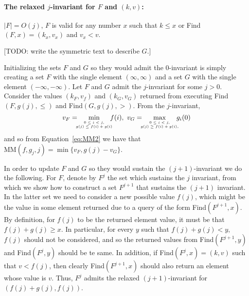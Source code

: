 \paragraph{The relaxed $j$-invariant for $F$ and $(k, v)$:}
$|F| = O(j)$, $F$ is valid for any number $x$ such that $k \leq x$ or Find$(F, x) = (k_x, v_x)$ and $v_x < v$.
\bigskip

[TODO: write the symmetric text to describe $G$.]

Initializing the sets $F$ and $G$ so they would admit the $0$-invariant is simply creating a set $F$ with the single element $(\infty, \infty)$ and a set $G$ with the single element $(-\infty, -\infty)$.
Let $F$ and $G$ admit the $j$-invariant for some $j > 0$. 
Consider the values $(k_F, v_f)$ and $(k_G, v_G)$ returned from executing Find$(F, g(j), \leq)$ and Find$(G, g(j), >)$. From the $j$-invariant,
$$
v_F = \hspace{-1em}\min\limits_{{\tiny \begin{array}{c}
		0 \leq i < j, \\
		g(j) \leq f(i) + g(i)
		\end{array}}} \hspace{-1em} f(i), \ 
v_G = \hspace{-1em}\max\limits_{{\tiny \begin{array}{c}
		0 \leq i < j, \\
		g(j) \geq f(i) + g(i),
		\end{array}}} \hspace{-1em} g_{i}(0)
$$ 
and so from Equation~\ref{eq:MM2} we have that $\text{MM}(f, g_j, j) = \min\{v_F, g(j) - v_G\}$.



In order to update $F$ and $G$ so they would sustain the $(j+1)$-invariant we do the following. For $F$, denote by $F^j$ the set which sustains the $j$ invariant, from which we show how to construct a set $F^{j+1}$ that sustains the $(j+1)$ invariant. In the latter set we need to consider a new possible value $f(j)$, which might be the value in some element returned due to a query of the form Find$(F^{j+1}, x)$. By definition, for $f(j)$ to be the returned element value, it must be that $f(j) + g(j) \geq x$. In particular, for every $y$ such that $f(j) + g(j) < y$, $f(j)$ should not be considered, and so the returned values from Find$(F^{j+1}, y)$ and Find$(F^{j}, y)$ should be te same. In addition, if Find$(F^{j}, x) = (k, v)$ such that $v < f(j)$, then clearly Find$(F^{j+1}, x)$ should also return an element whose value is $v$. Thus, $F^j$ admits the relaxed $(j+1)$-invariant for $(f(j) + g(j), f(j))$.


